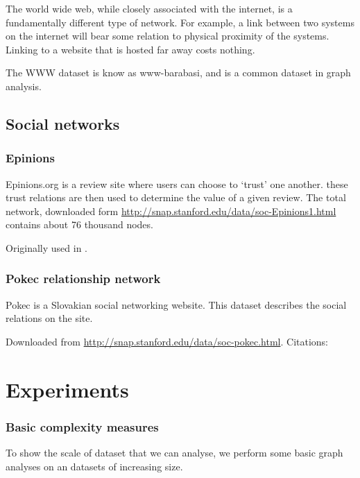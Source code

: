\documentclass{article}
\begin{document}
The world wide web, while closely associated with the internet, is a fundamentally different type of network. For example, a link between two systems on the internet will bear some relation to physical proximity of the systems. Linking to a website that is hosted far away costs nothing.

The WWW dataset is know as www-barabasi, and is a common dataset in graph analysis. 

\subsection*{Social networks}
\subsubsection*{Epinions}

Epinions.org is a review site where users can choose to `trust' one another. these trust relations are then used to determine the value of a given review. The total network, downloaded form \url{http://snap.stanford.edu/data/soc-Epinions1.html} contains about 76 thousand nodes.

Originally used in \cite{richardson2003trust}.

\subsubsection*{Pokec relationship network}

Pokec is a Slovakian social networking website. This dataset describes the social relations on the site.

Downloaded from \url{http://snap.stanford.edu/data/soc-pokec.html}. Citations: \cite{takacdata}


\section*{Experiments}

\subsubsection*{Basic complexity measures}

To show the scale of dataset that we can analyse, we perform some basic graph analyses on an datasets of increasing size.
\end{document}
